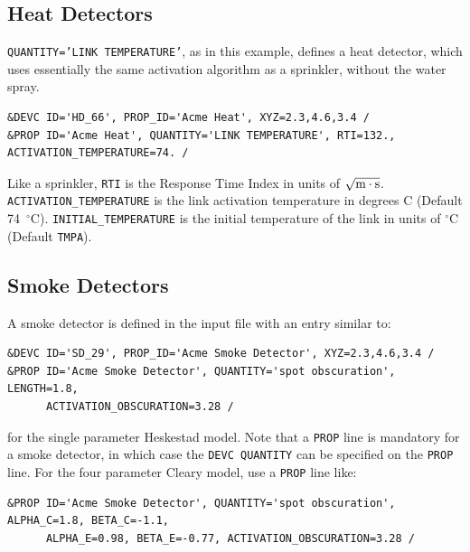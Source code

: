 \documentclass[11pt]{book}
\newcommand{\ct}{\tt\small}
\begin{document}
\subsection{Heat Detectors}
\label{info:heat_detectors}

{\ct QUANTITY='LINK TEMPERATURE'}, as in this example, defines a heat detector, which uses essentially the same activation algorithm as a sprinkler, without the water spray.

\footnotesize
\begin{verbatim}
&DEVC ID='HD_66', PROP_ID='Acme Heat', XYZ=2.3,4.6,3.4 /
&PROP ID='Acme Heat', QUANTITY='LINK TEMPERATURE', RTI=132., ACTIVATION_TEMPERATURE=74. /
\end{verbatim}

\normalsize
\noindent
Like a sprinkler, {\ct RTI} is the Response Time Index in units of
$\sqrt{\hbox{m}\cdot \hbox{s}}$.
{\ct ACTIVATION\_TEMPERATURE} is the link activation temperature in degrees C (Default 74~$^\circ$C).
{\ct INITIAL\_TEMPERATURE} is the initial temperature of the link in units of $^\circ$C (Default {\ct TMPA}).



\subsection{Smoke Detectors}
\label{info:smoke_detector}

A smoke detector is defined in the input file with an entry similar to:

\footnotesize
\begin{verbatim}
&DEVC ID='SD_29', PROP_ID='Acme Smoke Detector', XYZ=2.3,4.6,3.4 /
&PROP ID='Acme Smoke Detector', QUANTITY='spot obscuration', LENGTH=1.8,
      ACTIVATION_OBSCURATION=3.28 /
\end{verbatim}

\normalsize
\noindent
for the single parameter Heskestad model. Note that a {\ct PROP} line is mandatory for a smoke detector, in which case the
{\ct DEVC QUANTITY} can be specified on the {\ct PROP} line. For the four parameter Cleary model, use a {\ct PROP} line like:

\footnotesize
\begin{verbatim}
&PROP ID='Acme Smoke Detector', QUANTITY='spot obscuration', ALPHA_C=1.8, BETA_C=-1.1,
      ALPHA_E=0.98, BETA_E=-0.77, ACTIVATION_OBSCURATION=3.28 /
\end{verbatim}
\end{document}
